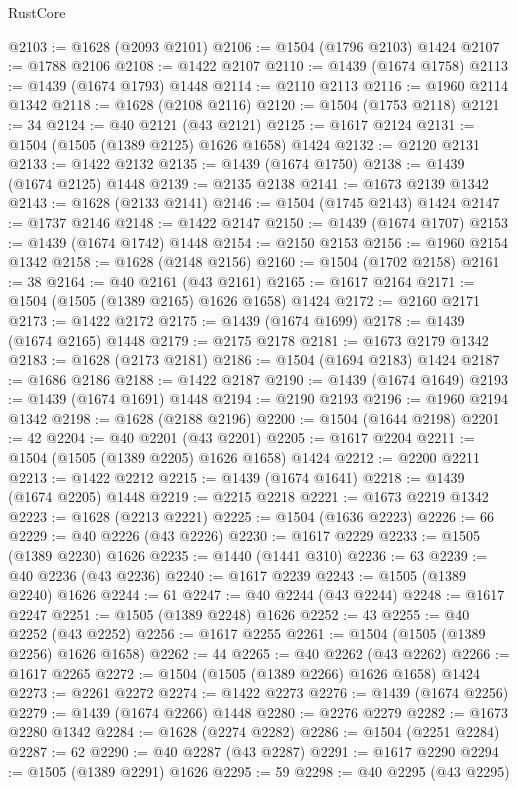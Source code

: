 \begin{lexlean}{RustCore}
\begin{coremodule}
@2103 := @1628 (@2093 @2101)
@2106 := @1504 (@1796 @2103) @1424
@2107 := @1788 @2106
@2108 := @1422 @2107
@2110 := @1439 (@1674 @1758)
@2113 := @1439 (@1674 @1793) @1448
@2114 := @2110 @2113
@2116 := @1960 @2114 @1342
@2118 := @1628 (@2108 @2116)
@2120 := @1504 (@1753 @2118)
@2121 := 34
@2124 := @40 @2121 (@43 @2121)
@2125 := @1617 @2124
@2131 := @1504 (@1505 (@1389 @2125) @1626 @1658) @1424
@2132 := @2120 @2131
@2133 := @1422 @2132
@2135 := @1439 (@1674 @1750)
@2138 := @1439 (@1674 @2125) @1448
@2139 := @2135 @2138
@2141 := @1673 @2139 @1342
@2143 := @1628 (@2133 @2141)
@2146 := @1504 (@1745 @2143) @1424
@2147 := @1737 @2146
@2148 := @1422 @2147
@2150 := @1439 (@1674 @1707)
@2153 := @1439 (@1674 @1742) @1448
@2154 := @2150 @2153
@2156 := @1960 @2154 @1342
@2158 := @1628 (@2148 @2156)
@2160 := @1504 (@1702 @2158)
@2161 := 38
@2164 := @40 @2161 (@43 @2161)
@2165 := @1617 @2164
@2171 := @1504 (@1505 (@1389 @2165) @1626 @1658) @1424
@2172 := @2160 @2171
@2173 := @1422 @2172
@2175 := @1439 (@1674 @1699)
@2178 := @1439 (@1674 @2165) @1448
@2179 := @2175 @2178
@2181 := @1673 @2179 @1342
@2183 := @1628 (@2173 @2181)
@2186 := @1504 (@1694 @2183) @1424
@2187 := @1686 @2186
@2188 := @1422 @2187
@2190 := @1439 (@1674 @1649)
@2193 := @1439 (@1674 @1691) @1448
@2194 := @2190 @2193
@2196 := @1960 @2194 @1342
@2198 := @1628 (@2188 @2196)
@2200 := @1504 (@1644 @2198)
@2201 := 42
@2204 := @40 @2201 (@43 @2201)
@2205 := @1617 @2204
@2211 := @1504 (@1505 (@1389 @2205) @1626 @1658) @1424
@2212 := @2200 @2211
@2213 := @1422 @2212
@2215 := @1439 (@1674 @1641)
@2218 := @1439 (@1674 @2205) @1448
@2219 := @2215 @2218
@2221 := @1673 @2219 @1342
@2223 := @1628 (@2213 @2221)
@2225 := @1504 (@1636 @2223)
@2226 := 66
@2229 := @40 @2226 (@43 @2226)
@2230 := @1617 @2229
@2233 := @1505 (@1389 @2230) @1626
@2235 := @1440 (@1441 @310)
@2236 := 63
@2239 := @40 @2236 (@43 @2236)
@2240 := @1617 @2239
@2243 := @1505 (@1389 @2240) @1626
@2244 := 61
@2247 := @40 @2244 (@43 @2244)
@2248 := @1617 @2247
@2251 := @1505 (@1389 @2248) @1626
@2252 := 43
@2255 := @40 @2252 (@43 @2252)
@2256 := @1617 @2255
@2261 := @1504 (@1505 (@1389 @2256) @1626 @1658)
@2262 := 44
@2265 := @40 @2262 (@43 @2262)
@2266 := @1617 @2265
@2272 := @1504 (@1505 (@1389 @2266) @1626 @1658) @1424
@2273 := @2261 @2272
@2274 := @1422 @2273
@2276 := @1439 (@1674 @2256)
@2279 := @1439 (@1674 @2266) @1448
@2280 := @2276 @2279
@2282 := @1673 @2280 @1342
@2284 := @1628 (@2274 @2282)
@2286 := @1504 (@2251 @2284)
@2287 := 62
@2290 := @40 @2287 (@43 @2287)
@2291 := @1617 @2290
@2294 := @1505 (@1389 @2291) @1626
@2295 := 59
@2298 := @40 @2295 (@43 @2295)

\end{coremodule}
\end{lexlean}
